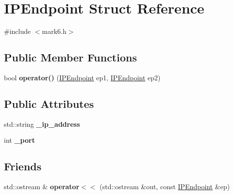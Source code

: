 \hypertarget{struct_i_p_endpoint}{
\section{IPEndpoint Struct Reference}
\label{struct_i_p_endpoint}
}


{\ttfamily \#include $<$mark6.h$>$}

\subsection*{Public Member Functions}
\begin{DoxyCompactItemize}
\item 
\hypertarget{struct_i_p_endpoint_aa2f84ec3c9aac2241a0eb9ed0d6797f7}{
bool {\bfseries operator()} (\hyperlink{struct_i_p_endpoint}{IPEndpoint} ep1, \hyperlink{struct_i_p_endpoint}{IPEndpoint} ep2)}
\label{struct_i_p_endpoint_aa2f84ec3c9aac2241a0eb9ed0d6797f7}

\end{DoxyCompactItemize}
\subsection*{Public Attributes}
\begin{DoxyCompactItemize}
\item 
\hypertarget{struct_i_p_endpoint_a1d6933bebbe7efcb348a5097575f2ec3}{
std::string {\bfseries \_\-ip\_\-address}}
\label{struct_i_p_endpoint_a1d6933bebbe7efcb348a5097575f2ec3}

\item 
\hypertarget{struct_i_p_endpoint_a638b4555b5722f4fd40d44a24f205651}{
int {\bfseries \_\-port}}
\label{struct_i_p_endpoint_a638b4555b5722f4fd40d44a24f205651}

\end{DoxyCompactItemize}
\subsection*{Friends}
\begin{DoxyCompactItemize}
\item 
\hypertarget{struct_i_p_endpoint_a50d3024dbf78071bd98e2d5e6ab1e07d}{
std::ostream \& {\bfseries operator$<$$<$} (std::ostream \&out, const \hyperlink{struct_i_p_endpoint}{IPEndpoint} \&ep)}
\label{struct_i_p_endpoint_a50d3024dbf78071bd98e2d5e6ab1e07d}

\end{DoxyCompactItemize}


